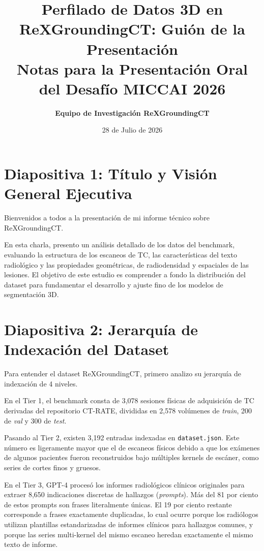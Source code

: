 \documentclass[11pt, a4paper]{article}
\title{\textbf{Perfilado de Datos 3D en ReXGroundingCT: Guión de la Presentación}\\[0.3em]
\large Notas para la Presentación Oral del Desafío MICCAI 2026}
\author{\textbf{Equipo de Investigación ReXGroundingCT}}
\date{28 de Julio de 2026}
\begin{document}
\maketitle
\vspace{1.5em}

\section{Diapositiva 1: Título y Visión General Ejecutiva}

Bienvenidos a todos a la presentación de mi informe técnico sobre ReXGroundingCT.

En esta charla, presento un análisis detallado de los datos del benchmark, evaluando la estructura de los escaneos de TC, las características del texto radiológico y las propiedades geométricas, de radiodensidad y espaciales de las lesiones. El objetivo de este estudio es comprender a fondo la distribución del dataset para fundamentar el desarrollo y ajuste fino de los modelos de segmentación 3D.

\bigskip

\section{Diapositiva 2: Jerarquía de Indexación del Dataset}

Para entender el dataset ReXGroundingCT, primero analizo su jerarquía de indexación de 4 niveles.

En el Tier 1, el benchmark consta de 3,078 sesiones físicas de adquisición de TC derivadas del repositorio CT-RATE, divididas en 2,578 volúmenes de \textit{train}, 200 de \textit{val} y 300 de \textit{test}.

Pasando al Tier 2, existen 3,192 entradas indexadas en \texttt{dataset.json}. Este número es ligeramente mayor que el de escaneos físicos debido a que los exámenes de algunos pacientes fueron reconstruidos bajo múltiples kernels de escáner, como series de cortes finos y gruesos.

En el Tier 3, GPT-4 procesó los informes radiológicos clínicos originales para extraer 8,650 indicaciones discretas de hallazgos (\textit{prompts}). Más del 81 por ciento de estos prompts son frases literalmente únicas. El 19 por ciento restante corresponde a frases exactamente duplicadas, lo cual ocurre porque los radiólogos utilizan plantillas estandarizadas de informes clínicos para hallazgos comunes, y porque las series multi-kernel del mismo escaneo heredan exactamente el mismo texto de informe.
\end{document}
